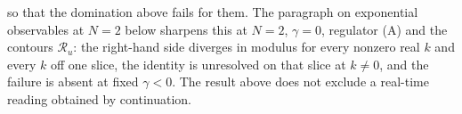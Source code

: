 so that the domination above fails for them. The paragraph on exponential observables at \(N=2\) below sharpens this at \(N=2\), \(\gamma=0\), regulator (A) and the contours \(\mathcal R_u\): the right-hand side diverges in modulus for every nonzero real \(k\) and every \(k\) off one slice, the identity is unresolved on that slice at \(k\ne0\), and the failure is absent at fixed \(\gamma<0\). The result above does not exclude a real-time reading obtained by continuation.
